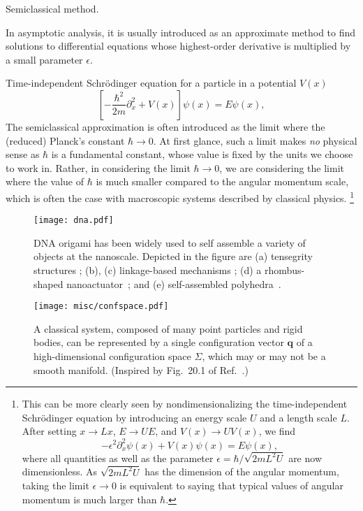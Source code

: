 Semiclassical method.

In asymptotic analysis, it is usually introduced as an approximate method to find solutions to differential equations whose highest-order derivative is multiplied by a small parameter $\epsilon$.

Time-independent Schr\"{o}dinger equation for a particle in a potential $V(x)$
%
\begin{equation}
  \left[-\frac{\hbar^{2}}{2m}\partial_{x}^{2} + V(x)\right]\psi(x) = E\psi(x),
\end{equation}
%
The semiclassical approximation is often introduced as the limit where the (reduced) Planck's constant $\hbar \to 0$.
At first glance, such a limit makes \emph{no} physical sense as $\hbar$ is a fundamental constant, whose value is fixed by the units we choose to work in.
Rather, in considering the limit $\hbar \to 0$, we are considering the limit where the value of $\hbar$ is much smaller compared to the angular momentum scale, which is often the case with macroscopic systems described by classical physics.%
\footnote{%
  This can be more clearly seen by nondimensionalizing the time-independent Schr\"{o}dinger equation by introducing an energy scale $U$ and a length scale $L$. After setting $x \to L{x}$, $E \to U{E}$, and $V(x) \to U{V}(x)$, we find
%
\begin{equation}
  -\epsilon^{2}\partial_{{x}}^{2}\psi(x) + {V}(x)\psi(x) = {E}\psi(x),
\end{equation}
%
where all quantities as well as the parameter $\epsilon = \hbar/\sqrt{2mL^{2}U}$ are now dimensionless.
As $\sqrt{2mL^{2}U}$ has the dimension of the angular momentum, taking the limit $\epsilon \to 0$ is equivalent to saying that typical values of angular momentum is much larger than $\hbar$.}

\begin{figure}
  \begin{center}
    \texttt{[image: dna.pdf]}
  \end{center}
  \caption{DNA origami has been widely used to self assemble a variety of objects at the nanoscale.
Depicted in the figure are (a) tensegrity structures \cite{liedl2010}; (b), (c) linkage-based mechanisms \cite{marras2015,zhou2015}; (d) a rhombus-shaped nanoactuator~\cite{ke2016}; and (e) self-assembled polyhedra~\cite{iinuma2014}.}
  \label{fig:dna_origami}
\end{figure}

\begin{figure}
  \begin{center}
    \texttt{[image: misc/confspace.pdf]}
  \end{center}
  \caption{A classical system, composed of many point particles and rigid bodies, can be represented by a single configuration vector $\bm{q}$ of a high-dimensional configuration space $\Sigma$, which may or may not be a smooth manifold. (Inspired by Fig.~20.1 of Ref.~\cite{penrose2004}.)}
  \label{fig:confspace}
\end{figure}

